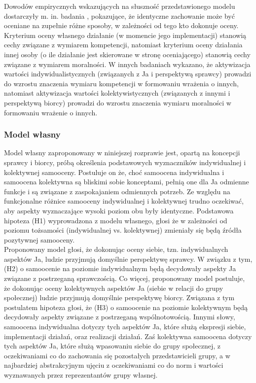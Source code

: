 \documentclass[man]{apa6}
\begin{document}
Dowodów empirycznych wskazujących na słuszność przedstawionego modelu dostarczyły m. in. badania \textcite{wojciszke1994multiple}, pokazujące, że identyczne zachowanie może być oceniane na zupełnie różne sposoby, w zależności od tego kto dokonuje oceny. Kryterium oceny własnego działanie (w momencie jego implementacji) stanowią cechy związane z wymiarem kompetencji, natomiast kryterium oceny działania innej osoby (o ile działanie jest skierowane w stronę oceniającego) stanowią cechy związane z wymiarem moralności. W innych badaniach \parencite{wojciszke1997parallels} wykazano, że aktywizacja wartości indywidualistycznych (związanych z Ja i perspektywą sprawcy) prowadzi do wzrostu znaczenia wymiaru kompetencji w formowaniu wrażenia o innych, natomiast aktywizacja wartości kolektywistycznych (związanych z innymi i perspektywą biorcy) prowadzi do wzrostu znaczenia wymiaru moralności w formowaniu wrażenie o innych.\\

\subsubsection{Model własny}
Model własny zaproponowany w niniejszej rozprawie jest, opartą na koncepcji sprawcy i biorcy, próbą określenia podstawowych wyznaczników indywidualnej i kolektywnej samooceny. Postuluje on że, choć samoocena indywidualna i samoocena kolektywna są bliskimi sobie konceptami, pełnią one dla Ja odmienne funkcje i są związane z zaspokajaniem odmiennych potrzeb. Ze względu na funkcjonalne różnice samooceny indywidualnej i kolektywnej trudno oczekiwać, aby aspekty wyznaczające wysoki poziom obu były identyczne. Podstawowa hipoteza (H1) wyprowadzona z modelu własnego, głosi że w zależności od poziomu tożsamości (indywidualnej vs. kolektywnej) zmieniały się będą źródła pozytywnej samooceny.\\

Proponowany model głosi, że dokonując oceny siebie, tzn. indywidualnych aspektów Ja, ludzie przyjmują domyślnie perspektywę sprawcy. W związku z tym, (H2) o samoocenie na poziomie indywidualnym będą decydowały aspekty Ja związane z postrzeganą sprawczością. Co więcej, proponowany model postuluje, że dokonując oceny kolektywnych aspektów Ja (siebie w relacji do grupy społecznej) ludzie przyjmują domyślnie perspektywę biorcy. Związana z tym postulatem hipoteza głosi, że (H3) o samoocenie na poziomie kolektywnym będą decydowały aspekty związane z postrzeganą wspólnotowością. Innymi słowy, samoocena indywidualna dotyczy tych aspektów Ja, które służą ekspresji siebie, implementacji działań, oraz realizacji działań. Zaś kolektywna samoocena dotyczy tych aspektów Ja, które służą wpasowaniu siebie do grupy społecznej, z oczekiwaniami co do zachowania się pozostałych przedstawicieli grupy, a w najbardziej abstrakcyjnym ujęciu z oczekiwaniami co do norm i wartości wyznawanych przez reprezentantów grupy własnej.\\
\end{document}
